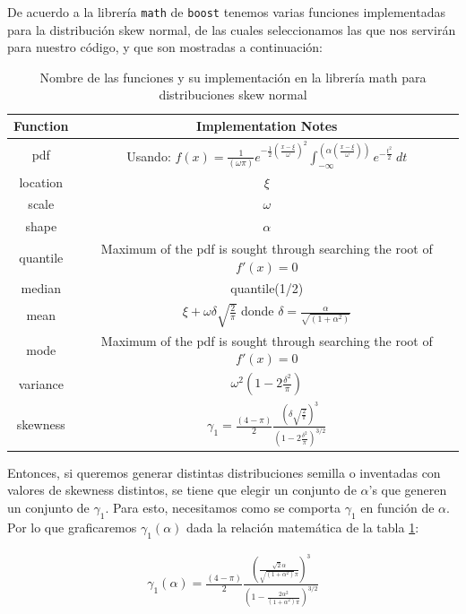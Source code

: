 \documentclass[11pt,letterpaper]{article}
\begin{document}
De acuerdo a la librería \verb|math| de \verb|boost| tenemos varias funciones implementadas para la distribución skew normal, de las cuales seleccionamos las que nos servirán para nuestro código, y que son mostradas a continuación:


\begin{table}[H]
\centering
\begin{tabular}{|c|c|}
\hline
\textbf{Function} & \textbf{	
Implementation Notes} \\
\hline
pdf & Usando: $f(x) = \frac{1}{(\omega \pi)}e^{-\frac{1}{2}\left( \frac{x-\xi }{\omega }\right)^{2}} \int_{{-\infty }}^{\left(\alpha \left(\frac{x-\xi }{\omega } \right)\right)}e^{-\frac{t^2}{2}}\ dt$ \\
\hline
location & $\xi$ \\
\hline
scale &  $\omega$ \\
\hline
shape & $\alpha$ \\
\hline
quantile & Maximum of the pdf is sought through searching the root of $f'(x)=0$ \\
\hline
median & quantile(1/2) \\
\hline
mean & $\xi + \omega \delta \sqrt{\frac{2}{\pi}}$ donde $\delta = \frac{\alpha}{\sqrt{(1+\alpha^2)}}$ \\
\hline
mode & Maximum of the pdf is sought through searching the root of $f'(x)=0$ \\
\hline
variance & $\omega^2\left( 1-2\frac{\delta^2}{\pi}\right)$ \\
\hline
skewness & $  \gamma_1 = \frac{(4-\pi)}{2} \frac{\left(\delta \sqrt{\frac{2}{\pi}} \right)^3}{\left(1-2\frac{\delta^2}{\pi} \right)^{3/2}}$ \\
\hline
\end{tabular}
\caption{Nombre de las funciones y su implementación en la librería math para distribuciones skew normal}
\label{boost_functions}
\end{table}

Entonces, si queremos generar distintas distribuciones semilla o inventadas con valores de skewness distintos, se tiene que elegir un conjunto de $\alpha$'s que generen un conjunto de $\gamma_1$. Para esto, necesitamos como se comporta $\gamma_1$ en función de $\alpha$. Por lo que graficaremos $\gamma_1(\alpha)$ dada la relación matemática de la tabla \ref{boost_functions}:

\begin{align}
 \gamma_1(\alpha) = \frac{(4-\pi)}{2} \frac{\left( \frac{\sqrt{2}\alpha}{\sqrt{(1+\alpha^2)}\pi} \right)^3}{\left(1-\frac{2\alpha^2}{(1+\alpha^2)\pi}\right)^{3/2}}
\end{align}
\end{document}
